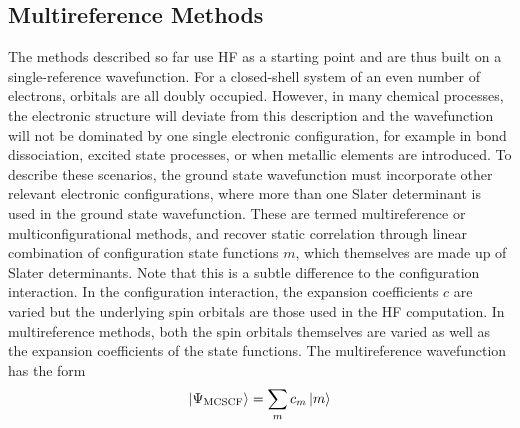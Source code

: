 \subsection{Multireference Methods}\label{section: methods_multiconf}
The methods described so far use \ac{HF} as a starting point and are thus built on a single-reference wavefunction. For a closed-shell system of an even number of electrons, orbitals are all doubly occupied. However, in many chemical processes, the electronic structure will deviate from this description and the wavefunction will not be dominated by one single electronic configuration, for example in bond dissociation, excited state processes, or when metallic elements are introduced. To describe these scenarios, the ground state wavefunction must incorporate other relevant electronic configurations, where more than one Slater determinant is used in the ground state wavefunction. These are termed multireference or multiconfigurational methods, and recover static correlation through linear combination of configuration state functions $m$, which themselves are made up of Slater determinants. Note that this is a subtle difference to the configuration interaction. In the configuration interaction, the expansion coefficients $c$ are varied but the underlying spin orbitals are those used in the \ac{HF} computation. In multireference methods, both the spin orbitals themselves are varied as well as the expansion coefficients of the state functions. The multireference wavefunction has the form
\begin{equation}
    \ket{\Psi_{\mathrm{MCSCF}}}=\sum_{m}c_{m}\ket{m}
\end{equation}
